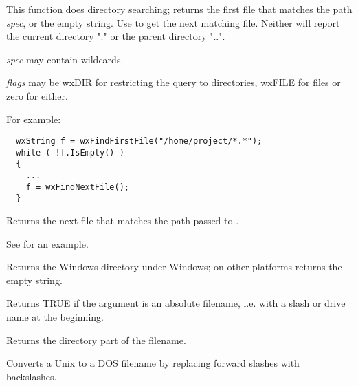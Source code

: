 This function does directory searching; returns the first file
that matches the path {\it spec}, or the empty string. Use  to
get the next matching file. Neither will report the current directory "." or the
parent directory "..".

{\it spec} may contain wildcards.

{\it flags} may be wxDIR for restricting the query to directories, wxFILE for files or zero for either.

For example:

\begin{verbatim}
  wxString f = wxFindFirstFile("/home/project/*.*");
  while ( !f.IsEmpty() )
  {
    ...
    f = wxFindNextFile();
  }
\end{verbatim}

\label{wxfindnextfile}


Returns the next file that matches the path passed to .

See  for an example.

\label{wxgetosdirectory}


Returns the Windows directory under Windows; on other platforms returns the empty string.



Returns TRUE if the argument is an absolute filename, i.e. with a slash
or drive name at the beginning.



Returns the directory part of the filename.



Converts a Unix to a DOS filename by replacing forward
slashes with backslashes.



